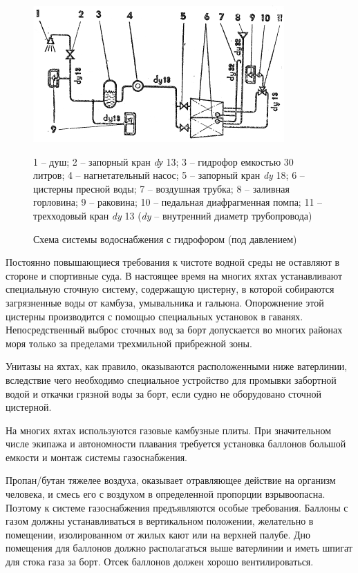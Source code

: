 \documentclass[a4paper, 12pt, twoside, final, book, russian, fittopage, cyremdash]{ncc}
\begin{document}
\begin{figure}[htb]
  \centering
  \includegraphics[scale=1.2]{0036P}
  \caption{Схема системы водоснабжения с гидрофором (под давлением)}
  \label{fig:36}
  \small
  \centering{}
  1 \--- душ; 2 \--- запорный кран \textit{dу} 13; 3 \--- гидрофор емкостью 30 литров; 4 \--- нагнетательный насос; 5 \--- запорный кран \textit{dy} 18; 6 \--- цистерны пресной воды; 7 \--- воздушная трубка; 8 \--- заливная горловина; 9 \--- раковина; 10 \--- педальная диафрагменная помпа; 11 \--- трехходовый кран \textit{dy} 13 (\textit{dy} \--- внутренний диаметр трубопровода)
\end{figure}

Постоянно повышающиеся требования к чистоте водной среды не оставляют в стороне и спортивные суда. В настоящее время на многих яхтах устанавливают специальную сточную систему, содержащую цистерну, в которой собираются загрязненные воды от камбуза, умывальника и гальюна. Опорожнение этой цистерны производится с помощью специальных установок в гаванях. Непосредственный выброс сточных вод за борт допускается во многих районах моря только за пределами трехмильной прибрежной зоны. 

Унитазы на яхтах, как правило, оказываются расположенными ниже ватерлинии, вследствие чего необходимо специальное устройство для промывки забортной водой и откачки грязной воды за борт, если судно не оборудовано сточной цистерной. 

На многих яхтах используются газовые камбузные плиты. При значительном числе экипажа и автономности плавания требуется установка баллонов большой емкости и монтаж системы газоснабжения. 

Пропан\-/бутан тяжелее воздуха, оказывает отравляющее действие на организм человека, и смесь его с воздухом в определенной пропорции взрывоопасна. Поэтому к системе газоснабжения предъявляются особые требования. Баллоны с газом должны устанавливаться в вертикальном положении, желательно в помещении, изолированном от жилых кают или на верхней палубе. Дно помещения для баллонов должно располагаться выше ватерлинии и иметь шпигат для стока газа за борт. Отсек баллонов должен хорошо вентилироваться. 
\end{document}
